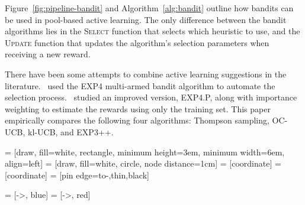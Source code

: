 \documentclass[fleqn,10pt,lineno]{wlpeerj} %
\begin{document}
Figure~\ref{fig:pipeline-bandit} and Algorithm~\ref{alg:bandit} outline how
bandits can be used in pool-based active learning. The only difference between
the bandit algorithms lies in the
\textsc{Select} function that selects which heuristic to use, and the
\textsc{Update} function that updates the algorithm's selection parameters when
receiving a new reward.

There have been some attempts to combine active learning suggestions in the
literature.~\cite{baram04} used the EXP4 multi-armed bandit algorithm to
automate the selection process.~\cite{hsu15} studied an improved version,
EXP4.P, along with importance weighting to estimate the rewards using only the
training set. This paper empirically compares the following four algorithms:
Thompson sampling, OC-UCB, kl-UCB, and EXP3++.

 = [draw, fill=white, rectangle,
minimum height=3em, minimum width=6em, align=left]
 = [draw, fill=white, circle, node distance=1cm]
 = [coordinate]
 = [coordinate]
 = [pin edge={to-,thin,black}]

 = [->, blue]
 = [->, red]
\end{document}
